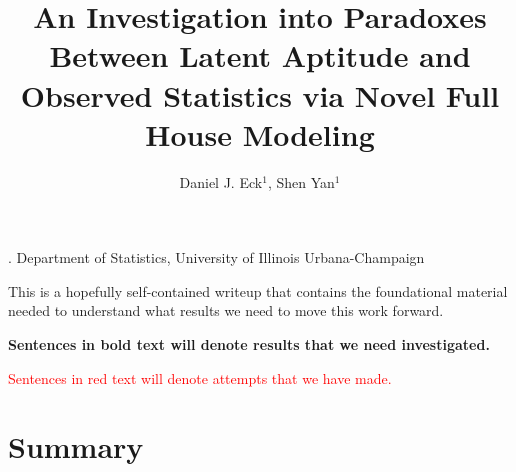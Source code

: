 \documentclass[12pt]{article}
\title{An Investigation into Paradoxes Between Latent Aptitude and Observed Statistics via Novel Full House Modeling}
\author{Daniel J. Eck$^1$, Shen Yan$^1$}
\date{}
\begin{document}
\maketitle

{. Department of Statistics, University of Illinois Urbana-Champaign \\}


\vspace{12pt}

\noindent This is a hopefully self-contained writeup that contains the foundational material needed to understand what results we need to move this work forward. 

\vspace{12pt}

\noindent \textbf{Sentences in bold text will denote results that we need investigated.}

\vspace{12pt}

\noindent \textcolor{red}{Sentences in red text will denote attempts that we have made.}

\section*{Summary}
\end{document}
